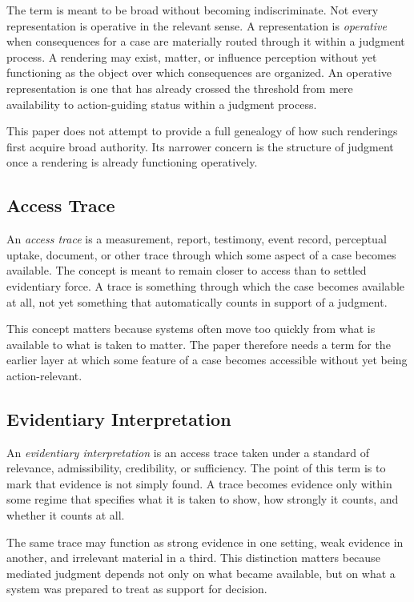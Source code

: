 \documentclass[11pt]{article}
\renewcommand{\emph}[1]{\textit{#1}}
\begin{document}
The term is meant to be broad without becoming indiscriminate. Not every representation is operative in the relevant sense. A representation is \emph{operative} when consequences for a case are materially routed through it within a judgment process. A rendering may exist, matter, or influence perception without yet functioning as the object over which consequences are organized. An operative representation is one that has already crossed the threshold from mere availability to action-guiding status within a judgment process.

This paper does not attempt to provide a full genealogy of how such renderings first acquire broad authority. Its narrower concern is the structure of judgment once a rendering is already functioning operatively.

\subsection{Access Trace}

An \emph{access trace} is a measurement, report, testimony, event record, perceptual uptake, document, or other trace through which some aspect of a case becomes available. The concept is meant to remain closer to access than to settled evidentiary force. A trace is something through which the case becomes available at all, not yet something that automatically counts in support of a judgment.

This concept matters because systems often move too quickly from what is available to what is taken to matter. The paper therefore needs a term for the earlier layer at which some feature of a case becomes accessible without yet being action-relevant.

\subsection{Evidentiary Interpretation}

An \emph{evidentiary interpretation} is an access trace taken under a standard of relevance, admissibility, credibility, or sufficiency. The point of this term is to mark that evidence is not simply found. A trace becomes evidence only within some regime that specifies what it is taken to show, how strongly it counts, and whether it counts at all.

The same trace may function as strong evidence in one setting, weak evidence in another, and irrelevant material in a third. This distinction matters because mediated judgment depends not only on what became available, but on what a system was prepared to treat as support for decision.
\end{document}
